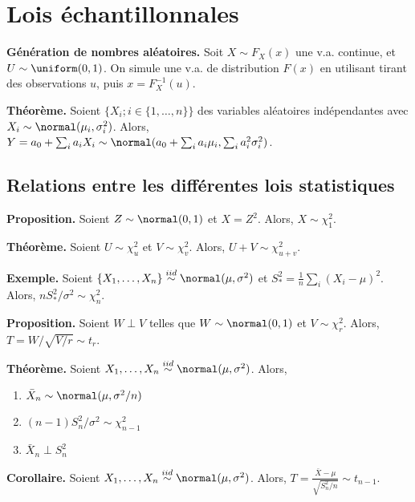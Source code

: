 \section{Lois échantillonnales}
\textbf{Génération de nombres aléatoires.} Soit $X \sim F_X(x)$ une v.a. continue, et $U \sim \uniform(0,1)$. On simule une v.a. de distribution $F(x)$ en utilisant tirant des observations $u$, puis $x=F_X^{-1}(u)$.


\textbf{Théorème.} Soient $\{X_i;i\in\{1,\dots,n\}\}$ des variables aléatoires indépendantes avec $X_i \sim \normal(\mu_i,\sigma_i^2)$. Alors, $Y = a_0 + \sum_{i} a_iX_i \sim \normal(a_0 + \sum_i a_i\mu_i, \sum_i a_i^2\sigma_i^2)$.

\subsection{Relations entre les différentes lois statistiques}

\textbf{Proposition.} Soient $Z \sim \normal(0,1)$ et $X=Z^2$. Alors, $X \sim \chi^2_1$.

\textbf{Théorème.} Soient $U \sim \chi^2_u$ et $V \sim \chi^2_v$. Alors, $U+V \sim \chi^2_{u+v}$.

\textbf{Exemple.} Soient $\{X_1, \dots, X_n\} \overset{iid}{\sim} \normal(\mu, \sigma^2)$ et $S^2_* = \frac{1}{n}\sum_i(X_i-\mu)^2$. Alors, $nS^2_*/\sigma^2 \sim \chi^2_n$.

\textbf{Proposition.} Soient $W \perp V$ telles que $W \sim \normal(0,1)$ et $V \sim \chi^2_r$. Alors, $T=W/\sqrt{V/r} \sim t_r$.

\textbf{Théorème.} Soient $X_1,\dots, X_n \overset{iid}{\sim} \normal(\mu,\sigma^2)$. Alors,
\begin{enumerate}
	\item $\bar{X}_n \sim \normal(\mu, \sigma^2/n)$
	\item $(n-1)S^2_n/\sigma^2 \sim \chi^2_{n-1}$
	\item $\bar{X}_n \perp S^2_n$
\end{enumerate}

\textbf{Corollaire.} Soient $X_1,\dots, X_n \overset{iid}{\sim} \normal(\mu,\sigma^2)$. Alors, $T=\frac{\bar{X}-\mu}{\sqrt{S^2_n/n}} \sim t_{n-1}$.

